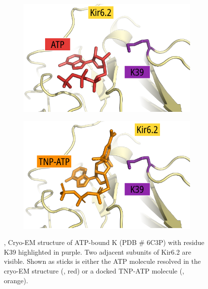 \begin{figure}[hbtp]
	\centering
	\begin{subfigure}[t]{0.45\textwidth}
		\caption{}\label{ch5fig:k39_clash_atp}
		\centering
		\includegraphics[width=\textwidth]{k39_clash_atp.pdf}
	\end{subfigure}
	\hfill
	\begin{subfigure}[t]{0.45\textwidth}
		\caption{}\label{ch5fig:k39_clash_tnpatp}
		\centering
		\includegraphics[width=\textwidth]{k39_clash_tnpatp.pdf}
	\end{subfigure}
	\caption[K39 is in close proximity to the TNP moiety of bound TNP-ATP]{
	{\bf{}}
	,  Cryo-EM structure of ATP-bound K\ATP{} (PDB \# 6C3P) with residue K39 highlighted in purple.
	Two adjacent subunits of Kir6.2 are visible.
	Shown as sticks is either the ATP molecule resolved in the cryo-EM structure (, red) or a docked TNP-ATP molecule (, orange).
	}\label{ch5fig:k39_3}
\end{figure}

